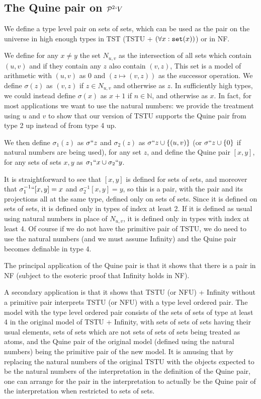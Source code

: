 \documentclass[12pt]{article}
\begin{document}
\subsection{The Quine pair on ${\cal P}^2`V$}

We define a type level pair on sets of sets, which can be used as the pair on the universe in high enough types in TST (TSTU + $(\forall x:{\tt set}(x))$) or in NF.

We define for any $x \neq y$ the set $N_{u,v}$ as the intersection of all sets which contain $(u,v)$ and if they contain any $z$ also contain $(v,z)$,  This set is a model of arithmetic
with $(u,v)$ as 0 and $(z \mapsto (v,z))$ as the successor operation.  We define $\sigma(z)$ as $(v,z)$ if $z \in N_{u,v}$ and otherwise as $z$.  In sufficiently high types,
we could instead define $\sigma(x)$ as $x+1$ if $n \in \mathbb N$, and otherwise as $x$.  In fact, for most applications we want to use the natural numbers:  we provide the treatment using
$u$ and $v$ to show that our version of TSTU supports the Quine pair from type 2 up instead of from type 4 up.

We then define $\sigma_1(z)$ as $\sigma``z$ and $\sigma_2(z)$ as $\sigma``z \cup \{(u,v)\}$ (or $\sigma``z \cup \{0\}$ if natural numbers are being used), for any set $z$, and define the Quine pair $[x,y]$, for any sets of sets $x,y$ as $\sigma_1``x \cup \sigma_2``y$.

It is straightforward to see that $[x,y]$ is defined for sets of sets, and moreover that $\sigma_1^{-1}``[x,y]=x$ and $\sigma_2^{-1}[x,y] = y$, so this is a pair, with the pair and its projections all at the same type,
defined only on sets of sets.  Since it is defined on sets of sets, it is defined only in types of index at least 2.  If it is defined as usual using natural numbers in place of $N_{u,v}$, it is defined only in types with index at least 4.  Of course if we do not have the primitive pair of TSTU, we do need to use the natural numbers (and we must assume Infinity) and the Quine pair becomes definable in type 4.

The principal application of the Quine pair is that it shows that there is a pair in NF (subject to the esoteric proof that Infinity holds in NF).

A secondary application is that it shows that TSTU (or NFU) + Infinity without a primitive pair interprets TSTU (or NFU) with a type level ordered pair.  The model with the type level ordered pair consists of the sets of sets
of type at least 4 in the original model of TSTU + Infinity, with sets of sets of sets having their usual elements, sets of sets which are not sets of sets of sets being treated as atoms, and the Quine pair
of the original model (defined using the natural numbers) being the primitive pair of the new model. It is amusing that by replacing the natural numbers of the original TSTU with the objects expected to be the natural numbers of the interpretation in the definition of the Quine pair, one can arrange for the pair in the interpretation to actually be the Quine pair of the interpretation when restricted to sets of sets.
\end{document}
